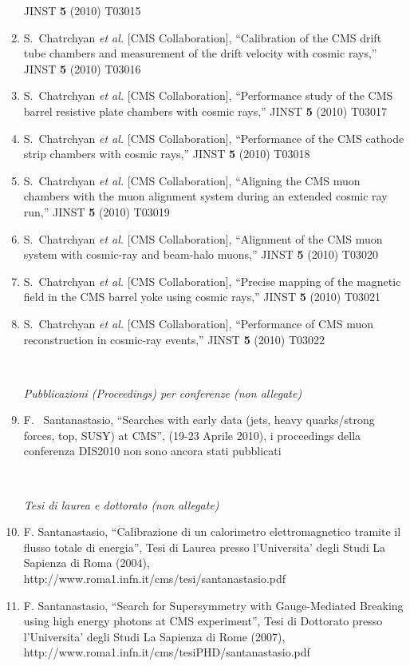 \documentclass[10pt]{letter}
\begin{document}
\begin{enumerate}
  JINST {\bf 5} (2010) T03015
\item S.~Chatrchyan {\it et al.}  [CMS Collaboration],
  ``Calibration of the CMS drift tube chambers and measurement of the drift velocity with cosmic rays,''
  JINST {\bf 5} (2010) T03016
\item S.~Chatrchyan {\it et al.}  [CMS Collaboration],
  ``Performance study of the CMS barrel resistive plate chambers with cosmic rays,''
  JINST {\bf 5} (2010) T03017
\item S.~Chatrchyan {\it et al.}  [CMS Collaboration],
  ``Performance of the CMS cathode strip chambers with cosmic rays,''
  JINST {\bf 5} (2010) T03018
\item S.~Chatrchyan {\it et al.}  [CMS Collaboration],
  ``Aligning the CMS muon chambers with the muon alignment system during an extended cosmic ray run,''
  JINST {\bf 5} (2010) T03019
\item S.~Chatrchyan {\it et al.}  [CMS Collaboration],
  ``Alignment of the CMS muon system with cosmic-ray and beam-halo muons,''
  JINST {\bf 5} (2010) T03020
\item S.~Chatrchyan {\it et al.}  [CMS Collaboration],
  ``Precise mapping of the magnetic field in the CMS barrel yoke using cosmic rays,''
  JINST {\bf 5} (2010) T03021
\item S.~Chatrchyan {\it et al.}  [CMS Collaboration],
  ``Performance of CMS muon reconstruction in cosmic-ray events,''
  JINST {\bf 5} (2010) T03022

~\\
\begin{center} \textit{Pubblicazioni (Proceedings) per conferenze (non allegate)} \\ \end{center}

\item F. ~Santanastasio, ``Searches with early data (jets, heavy quarks/strong forces, top, SUSY) at CMS'', 
(19-23 Aprile 2010), i proceedings della conferenza DIS2010 non sono ancora stati pubblicati


~\\
\begin{center} \textit{Tesi di laurea e dottorato (non allegate)} \\  \end{center}

\item F. Santanastasio, ``Calibrazione di un calorimetro elettromagnetico tramite il flusso totale di energia'', Tesi di Laurea presso l'Universita' degli Studi La Sapienza di Roma (2004), \\ http://www.roma1.infn.it/cms/tesi/santanastasio.pdf 
\item F. Santanastasio, ``Search for Supersymmetry with Gauge-Mediated Breaking using high energy photons at CMS experiment'', Tesi di Dottorato presso l'Universita' degli Studi La Sapienza di Rome (2007),\\ http://www.roma1.infn.it/cms/tesiPHD/santanastasio.pdf 


\end{enumerate}
\end{document}

